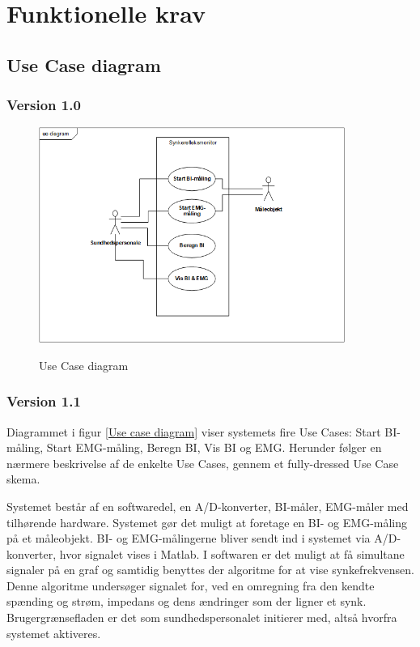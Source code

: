 \section{Funktionelle krav}
\subsection{Use Case diagram}

\subsubsection{Version 1.0} 
\begin{figure}[H]
\centering
{\includegraphics[width=10cm]
{Figure/usecasediagram}}
\caption{Use Case diagram}
\label{Use Case diagram}
\end{figure}
\subsubsection{Version 1.1} 
Diagrammet i figur \ref{Use case diagram} viser systemets fire Use Cases: Start BI-måling, Start EMG-måling, Beregn BI, Vis BI og EMG. Herunder følger en nærmere
beskrivelse af de enkelte Use Cases, gennem et fully-dressed Use Case skema.




Systemet består af en softwaredel, en A/D-konverter, BI-måler, EMG-måler med tilhørende hardware.
Systemet gør det muligt at foretage en BI- og EMG-måling på et måleobjekt. BI- og EMG-målingerne bliver sendt ind i systemet via A/D-konverter, hvor signalet vises i Matlab. I softwaren er det muligt at få simultane signaler på en graf og samtidig benyttes der algoritme for at vise synkefrekvensen. Denne algoritme undersøger signalet for, ved en omregning fra den kendte spænding og strøm, impedans og dens ændringer som der ligner et synk.
Brugergrænsefladen er det som sundhedspersonalet initierer med, altså hvorfra systemet aktiveres.


